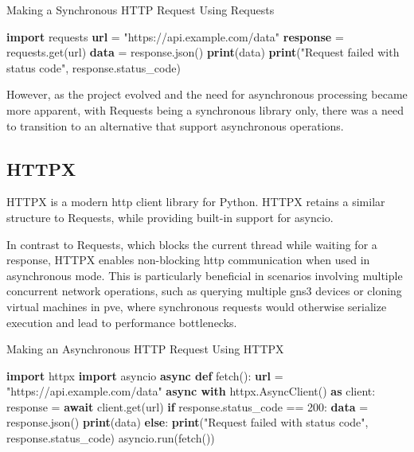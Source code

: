   \begin{algorithm}
    \caption{Making a Synchronous HTTP Request Using Requests}\label{requests-basic}
    \begin{algorithmic}[1]
      \State \textbf{import} requests
      \State
      \State \textbf{url} = "https://api.example.com/data"
      \State \textbf{response} = requests.get(url)
      \State
        \State \textbf{data} = response.json()
        \State \textbf{print}(data)
      \Else
        \State \textbf{print}("Request failed with status code", response.status\_code)
      \EndIf
    \end{algorithmic}
  \end{algorithm}

  However, as the project evolved and the need for asynchronous processing became more apparent, with Requests being a 
  synchronous library only, there was a need to transition to an alternative that support asynchronous operations.

\subsection{HTTPX}

  HTTPX\cite{httpx2025} is a modern \ac{http} client library for Python. HTTPX retains a similar structure to 
  Requests, while providing  built-in support for asyncio.

  In contrast to Requests, which blocks the current thread while waiting for a response, HTTPX enables non-blocking 
  \ac{http} communication when used in asynchronous mode. This is particularly beneficial in scenarios involving multiple 
  concurrent network operations, such as querying multiple \ac{gns3} devices or cloning virtual machines in \ac{pve}, 
  where synchronous requests would otherwise serialize execution and lead to performance bottlenecks.

  \begin{algorithm}
    \caption{Making an Asynchronous HTTP Request Using HTTPX}\label{httpx-basic}
    \begin{algorithmic}[1]
      \State \textbf{import} httpx
      \State \textbf{import} asyncio
      \State
      \State \textbf{async def} fetch():
      \State \hspace{1em} \textbf{url} = "https://api.example.com/data"
      \State \hspace{1em} \textbf{async with} httpx.AsyncClient() \textbf{as} client:
      \State \hspace{2em} response = \textbf{await} client.get(url)
      \State \hspace{2em} \textbf{if} response.status\_code == 200:
      \State \hspace{3em} \textbf{data} = response.json()
      \State \hspace{3em} \textbf{print}(data)
      \State \hspace{2em} \textbf{else}:
      \State \hspace{3em} \textbf{print}("Request failed with status code", response.status\_code)
      \State
      \State asyncio.run(fetch())
    \end{algorithmic}
  \end{algorithm}

